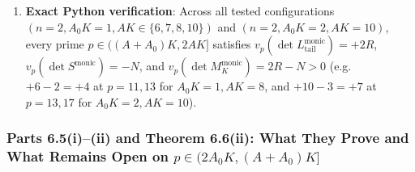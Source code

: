 \documentclass[11pt,a4paper]{article}
\begin{document}
\begin{enumerate}
  \[
    v_p\big(\det M_K^{\mathrm{monic}}(\mathbf{a}, c)\big) \ge 2R - N = (4n - 5)A_0 K + (2n - 3) \ge 3A_0 K + 1 > 0 \quad (\forall n \ge 2, A_0 K \ge 1),
  \]
  and even with the trivial $-2N$ bound, $2R - 2N = (4n - 6)A_0 K + 2(n - 2) \ge 2A_0 K > 0$.
  \item \textbf{Exact Python verification}: Across all tested configurations $(n=2, A_0 K=1, AK \in \{6,7,8,10\})$ and $(n=2, A_0 K=2, AK=10)$, every prime $p \in ((A+A_0)K, 2AK]$ satisfies $v_p(\det L_{\mathrm{tail}}^{\mathrm{monic}}) = +2R$, $v_p(\det S^{\mathrm{monic}}) = -N$, and $v_p(\det M_K^{\mathrm{monic}}) = 2R - N > 0$ (e.g.\ $+6 - 2 = +4$ at $p=11, 13$ for $A_0 K=1, AK=8$, and $+10 - 3 = +7$ at $p=13, 17$ for $A_0 K=2, AK=10$).
\end{enumerate}

\subsubsection{Parts 6.5(i)--(ii) and Theorem 6.6(ii): What They Prove and What Remains Open on $p \in (2A_0 K, (A+A_0)K]$}
\end{document}
